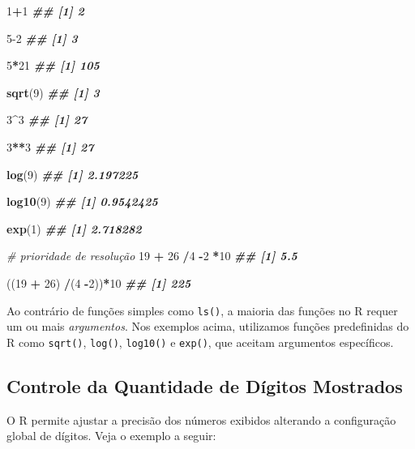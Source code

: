 \documentclass[
]{book}
\newenvironment{Shaded}{\begin{snugshade}}{\end{snugshade}}
\newcommand{\CommentTok}[1]{\textcolor[rgb]{0.56,0.35,0.01}{\textit{#1}}}
\newcommand{\DecValTok}[1]{\textcolor[rgb]{0.00,0.00,0.81}{#1}}
\newcommand{\DocumentationTok}[1]{\textcolor[rgb]{0.56,0.35,0.01}{\textbf{\textit{#1}}}}
\newcommand{\FunctionTok}[1]{\textcolor[rgb]{0.13,0.29,0.53}{\textbf{#1}}}
\newcommand{\NormalTok}[1]{#1}
\newcommand{\SpecialCharTok}[1]{\textcolor[rgb]{0.81,0.36,0.00}{\textbf{#1}}}
\begin{document}
\begin{Shaded}
\begin{Highlighting}[]
\DecValTok{1}\SpecialCharTok{+}\DecValTok{1}
\DocumentationTok{\#\# [1] 2}

\DecValTok{5{-}2}
\DocumentationTok{\#\# [1] 3}

\DecValTok{5}\SpecialCharTok{*}\DecValTok{21}
\DocumentationTok{\#\# [1] 105}

\FunctionTok{sqrt}\NormalTok{(}\DecValTok{9}\NormalTok{)}
\DocumentationTok{\#\# [1] 3}

\DecValTok{3}\SpecialCharTok{\^{}}\DecValTok{3}
\DocumentationTok{\#\# [1] 27}

\DecValTok{3}\SpecialCharTok{**}\DecValTok{3}
\DocumentationTok{\#\# [1] 27}

\FunctionTok{log}\NormalTok{(}\DecValTok{9}\NormalTok{)}
\DocumentationTok{\#\# [1] 2.197225}

\FunctionTok{log10}\NormalTok{(}\DecValTok{9}\NormalTok{)}
\DocumentationTok{\#\# [1] 0.9542425}

\FunctionTok{exp}\NormalTok{(}\DecValTok{1}\NormalTok{)}
\DocumentationTok{\#\# [1] 2.718282}

\CommentTok{\# prioridade de resolução}
\DecValTok{19} \SpecialCharTok{+} \DecValTok{26} \SpecialCharTok{/}\DecValTok{4} \SpecialCharTok{{-}}\DecValTok{2} \SpecialCharTok{*}\DecValTok{10}
\DocumentationTok{\#\# [1] 5.5}

\NormalTok{((}\DecValTok{19} \SpecialCharTok{+} \DecValTok{26}\NormalTok{) }\SpecialCharTok{/}\NormalTok{(}\DecValTok{4} \SpecialCharTok{{-}}\DecValTok{2}\NormalTok{))}\SpecialCharTok{*}\DecValTok{10}
\DocumentationTok{\#\# [1] 225}
\end{Highlighting}
\end{Shaded}

Ao contrário de funções simples como \texttt{ls()}, a maioria das funções no R
requer um ou mais \emph{argumentos}. Nos exemplos acima, utilizamos funções
predefinidas do R como \texttt{sqrt()}, \texttt{log()}, \texttt{log10()} e \texttt{exp()}, que
aceitam argumentos específicos.

\subsection{Controle da Quantidade de Dígitos Mostrados}\label{controle-da-quantidade-de-duxedgitos-mostrados}

O R permite ajustar a precisão dos números exibidos alterando a
configuração global de dígitos. Veja o exemplo a seguir:
\end{document}
